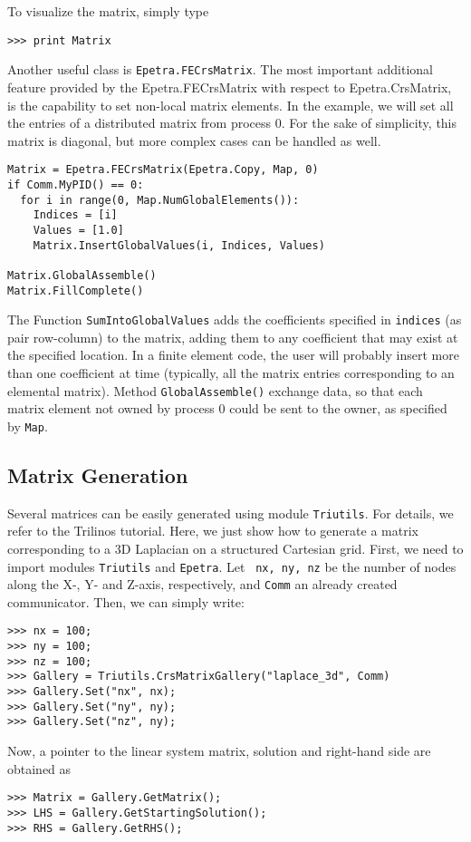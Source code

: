 \documentclass[10pt,relax]{SANDreport}
\begin{document}
To visualize the matrix, simply type
\begin{verbatim}
>>> print Matrix
\end{verbatim}

Another useful class is {\tt Epetra.FECrsMatrix}.
The most important additional feature provided by the
Epetra.FECrsMatrix with respect to Epetra.CrsMatrix, is the capability
to set non-local matrix elements. In the
example, we will set all the entries of a distributed matrix from
process 0. For the sake of simplicity, this matrix is diagonal, but more
complex cases can be handled as well.

\begin{verbatim}
Matrix = Epetra.FECrsMatrix(Epetra.Copy, Map, 0)
if Comm.MyPID() == 0:
  for i in range(0, Map.NumGlobalElements()):
    Indices = [i]
    Values = [1.0]
    Matrix.InsertGlobalValues(i, Indices, Values)

Matrix.GlobalAssemble() 
Matrix.FillComplete()
\end{verbatim}
The Function \verb!SumIntoGlobalValues! adds the coefficients specified
in \verb!indices! (as pair row-column) to the matrix, adding them to any
coefficient that may exist at the specified location. In a finite
element code, the user will probably insert more than one coefficient
at time (typically, all the matrix entries corresponding to an elemental
matrix). Method \verb!GlobalAssemble()! exchange data, so that 
each matrix element not owned by
process 0 could be sent to the owner, as specified by \verb!Map!. 

\subsection{Matrix Generation}
\label{sec:generation}

Several matrices can be easily generated using module {\tt Triutils}. For
details, we refer to the Trilinos tutorial. Here, we just show how to generate
a matrix corresponding to a 3D Laplacian on a structured Cartesian grid.
First, we need to import modules \verb!Triutils! and \verb!Epetra!. Let {\tt
  nx, ny, nz} be the number of nodes along the X-, Y- and Z-axis,
  respectively, and \verb!Comm! an already created communicator.
  Then, we can simply write:
\begin{verbatim}
>>> nx = 100;
>>> ny = 100;
>>> nz = 100;
>>> Gallery = Triutils.CrsMatrixGallery("laplace_3d", Comm)
>>> Gallery.Set("nx", nx);
>>> Gallery.Set("ny", ny);
>>> Gallery.Set("nz", ny);
\end{verbatim}
Now, a pointer to the linear system matrix, solution and right-hand side are
obtained as
\begin{verbatim}
>>> Matrix = Gallery.GetMatrix();
>>> LHS = Gallery.GetStartingSolution();
>>> RHS = Gallery.GetRHS();
\end{verbatim}
\end{document}
